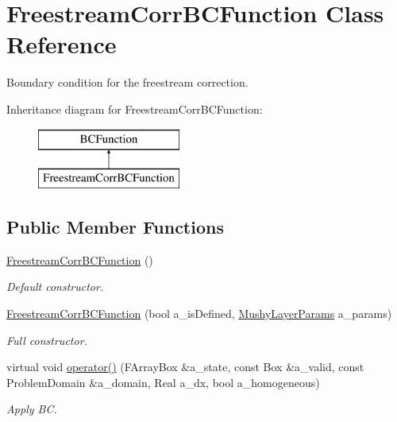 \hypertarget{class_freestream_corr_b_c_function}{\section{Freestream\-Corr\-B\-C\-Function Class Reference}
\label{class_freestream_corr_b_c_function}
}


Boundary condition for the freestream correction.  


Inheritance diagram for Freestream\-Corr\-B\-C\-Function\-:\begin{figure}[H]
\begin{center}
\leavevmode
\includegraphics[height=2.000000cm]{class_freestream_corr_b_c_function}
\end{center}
\end{figure}
\subsection*{Public Member Functions}
\begin{DoxyCompactItemize}
\item 
\hypertarget{class_freestream_corr_b_c_function_a172724d0d72e728a531a314bdf487eff}{\hyperlink{class_freestream_corr_b_c_function_a172724d0d72e728a531a314bdf487eff}{Freestream\-Corr\-B\-C\-Function} ()}\label{class_freestream_corr_b_c_function_a172724d0d72e728a531a314bdf487eff}

\begin{DoxyCompactList}\small\item\em Default constructor. \end{DoxyCompactList}\item 
\hypertarget{class_freestream_corr_b_c_function_a6ef77a0c95d316d78af7a43d01f18fce}{\hyperlink{class_freestream_corr_b_c_function_a6ef77a0c95d316d78af7a43d01f18fce}{Freestream\-Corr\-B\-C\-Function} (bool a\-\_\-is\-Defined, \hyperlink{class_mushy_layer_params}{Mushy\-Layer\-Params} a\-\_\-params)}\label{class_freestream_corr_b_c_function_a6ef77a0c95d316d78af7a43d01f18fce}

\begin{DoxyCompactList}\small\item\em Full constructor. \end{DoxyCompactList}\item 
\hypertarget{class_freestream_corr_b_c_function_a3d1570440733a0cdc9eeb853774d0f60}{virtual void \hyperlink{class_freestream_corr_b_c_function_a3d1570440733a0cdc9eeb853774d0f60}{operator()} (F\-Array\-Box \&a\-\_\-state, const Box \&a\-\_\-valid, const Problem\-Domain \&a\-\_\-domain, Real a\-\_\-dx, bool a\-\_\-homogeneous)}\label{class_freestream_corr_b_c_function_a3d1570440733a0cdc9eeb853774d0f60}

\begin{DoxyCompactList}\small\item\em Apply B\-C. \end{DoxyCompactList}\end{DoxyCompactItemize}
